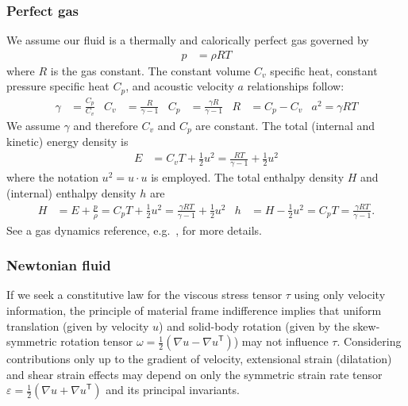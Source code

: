 \documentclass[letterpaper,11pt,nointlimits,reqno]{amsart}
\newcommand{\trans}[1]{{#1}^{\ensuremath{\mathsf{T}}}}
\begin{document}
\subsubsection{Perfect gas}

We assume our fluid is a thermally and calorically perfect gas governed by
\begin{align}
  \label{eq:perfectgaseos}
  p &= \rho{} R T
\end{align}
where $R$ is the gas constant. The constant volume $C_{v}$ specific heat,
constant pressure specific heat $C_{p}$, and acoustic velocity $a$
relationships follow:
\begin{align}
  \label{eq:perfectgasrelations}
  \gamma &= \frac{C_{p}}{C_{v}}
  &
  C_{v} &= \frac{R}{\gamma - 1}
  &
  C_{p} &= \frac{\gamma{}R}{\gamma-1}
  &
  R &= C_{p} - C_{v}
  &
  a^{2} = \gamma{}RT
\end{align}
We assume $\gamma$ and therefore $C_{v}$ and $C_{p}$ are constant.
The total (internal and kinetic) energy density is
\begin{align}
  \label{eq:perfectgastotalenergy}
  E &= C_{v} T + \frac{1}{2}u^{2}
     = \frac{RT}{\gamma-1} + \frac{1}{2}u^{2}
\end{align}
where the notation $u^2 = u\cdot{}u$ is employed.
The total enthalpy density $H$ and (internal) enthalpy density $h$ are
\begin{align}
  \label{eq:perfectgasenthalpy}
  H &= E + \frac{p}{\rho}
     = C_{p} T + \frac{1}{2}u^{2}
     = \frac{\gamma{}RT}{\gamma-1} + \frac{1}{2}u^{2}
  &
  h &= H - \frac{1}{2}u^{2}
     = C_{p} T
     = \frac{\gamma{}RT}{\gamma-1}
  .
\end{align}
See a gas dynamics reference, e.g.~\cite{LiepmannRoshko2002}, for more details.

\subsubsection{Newtonian fluid}
\label{sec:newtonianfluid}

If we seek a constitutive law for the viscous stress tensor $\tau$
using only velocity information, the principle of material frame
indifference implies that uniform translation (given by velocity $u$)
and solid-body rotation (given by the skew-symmetric rotation tensor
$\omega=\frac{1}{2}\left( \nabla{}u-\trans{\nabla{}u} \right)$)
may not influence $\tau$.  Considering contributions only up to the
gradient of velocity, extensional strain (dilatation) and shear strain
effects may depend on only the symmetric strain rate tensor
$\varepsilon=\frac{1}{2}\left( \nabla{}u+\trans{\nabla{}u}\right)$
and its principal invariants.
\end{document}
